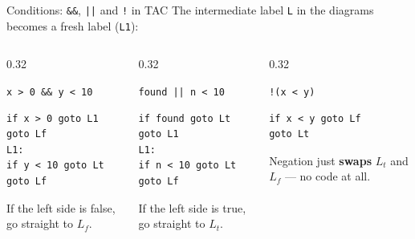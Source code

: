 \documentclass[aspectratio=169]{beamer}
\newcommand{\tc}[1]{\texttt{#1}}
\begin{document}
\begin{frame}[fragile]{Conditions: \tc{\&\&}, \tc{||} and \tc{!} in TAC}
  The intermediate label \tc{L} in the diagrams becomes a fresh label (\tc{L1}):

  \medskip
  \begin{columns}[T]
    \begin{column}{0.32\textwidth}
      \begin{block}{\tc{x > 0 \&\& y < 10}}
        \begin{verbatim}
if x > 0 goto L1
goto Lf
L1:
if y < 10 goto Lt
goto Lf
        \end{verbatim}
      \end{block}
      \scriptsize If the left side is false, go straight to $L_f$.
    \end{column}
    \begin{column}{0.32\textwidth}
      \begin{block}{\tc{found || n < 10}}
        \begin{verbatim}
if found goto Lt
goto L1
L1:
if n < 10 goto Lt
goto Lf
        \end{verbatim}
      \end{block}
      \scriptsize If the left side is true, go straight to $L_t$.
    \end{column}
    \begin{column}{0.32\textwidth}
      \begin{block}{\tc{!(x < y)}}
        \begin{verbatim}
if x < y goto Lf
goto Lt
        \end{verbatim}
      \end{block}
      \scriptsize Negation just \textbf{swaps} $L_t$ and $L_f$ — no code at all.
    \end{column}
  \end{columns}
\end{frame}
\end{document}
